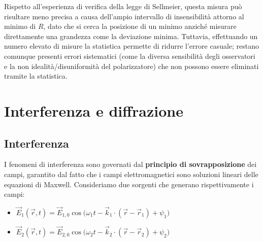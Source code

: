 \documentclass[openany,a4paper,12pt]{book}
\begin{document}
Rispetto all'esperienza di verifica della legge di Sellmeier, questa misura può risultare meno precisa a causa dell'ampio intervallo di insensibilità attorno al minimo di $R$, dato che si cerca la posizione di un minimo anziché misurare direttamente una grandezza come la deviazione minima. Tuttavia, effettuando un numero elevato di misure la statistica permette di ridurre l'errore casuale; restano comunque presenti errori sistematici (come la diversa sensibilità degli osservatori e la non idealità/disuniformità del polarizzatore) che non possono essere eliminati tramite la statistica.










\chapter{Interferenza e diffrazione}

\section{Interferenza}

I fenomeni di interferenza sono governati dal \textbf{principio di sovrapposizione} dei campi, garantito dal fatto che i campi elettromagnetici sono soluzioni lineari delle equazioni di Maxwell.
Consideriamo due sorgenti che generano rispettivamente i campi:
\begin{itemize}
    \item $\vec{E}_1(\vec{r}, t) = \vec{E}_{1,0} \cos\bigl(\omega_1 t - \vec{k}_1 \cdot (\vec{r} - \vec{r}_1) + \psi_1\bigr)$
    \item $\vec{E}_2(\vec{r}, t) = \vec{E}_{2,0} \cos\bigl(\omega_2 t - \vec{k}_2 \cdot (\vec{r} - \vec{r}_2) + \psi_2\bigr)$
\end{itemize}
\end{document}
